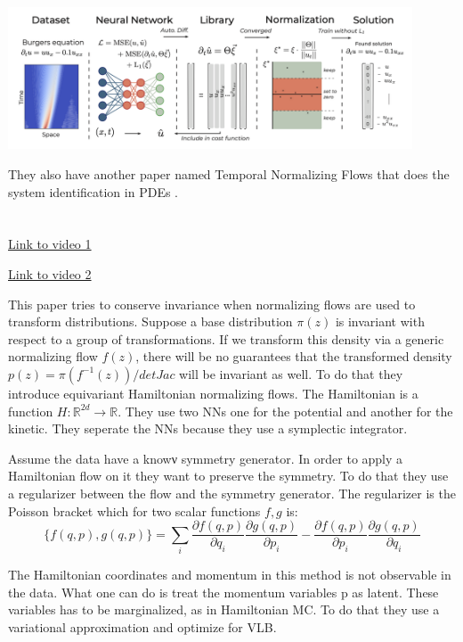 \documentclass{article}
\newcommand{\citeall}[1]{\citeauthor{#1}}
\begin{document}
\includegraphics[width=0.9\textwidth]{images/deepmod.png}

They also have another paper named Temporal Normalizing Flows that does the system identification in PDEs \cite{Both2019TemporalFlows}.

\section{\citeall{Rezende2019EquivariantFlows}}

\href{http://youtube.com/watch?v=8VV0kL7Qg3Y}{Link to video 1}

\href{https://slideslive.com/38922578/equivariant-hamiltonian-flows}{Link to video 2}


This paper tries to conserve invariance when normalizing flows are used to transform distributions. Suppose a base distribution $\pi(z)$ is invariant with respect to a group of transformations. If we transform this density via a generic normalizing flow $f(z)$, there will be no guarantees that the transformed density $p(z)=\pi(f^{−1}(z))/det Jac$ will be invariant as well.
To do that they introduce equivariant Hamiltonian normalizing flows. The Hamiltonian is a function $H: \mathbb{R}^{2 d} \rightarrow \mathbb{R}$. They use two NNs one for the potential and another for the kinetic. They seperate the NNs because they use a symplectic integrator. 

Assume the data have a knowν symmetry generator. In order to apply a Hamiltonian flow on it they want to preserve the symmetry. To do that they use a regularizer between the flow and the symmetry generator. The regularizer is the Poisson bracket which for two scalar functions $f,g$ is:
$$
\{f(q, p), g(q, p)\}=\sum_{i} \frac{\partial f(q, p)}{\partial q_{i}} \frac{\partial g(q, p)}{\partial p_{i}}-\frac{\partial f(q, p)}{\partial p_{i}} \frac{\partial g(q, p)}{\partial q_{i}}
$$

The Hamiltonian coordinates and momentum in this method is not observable in the data. What one can do is treat the momentum variables p as latent. These variables has to be marginalized, as in Hamiltonian MC. To do that they use a variational approximation and optimize for VLB.
\end{document}
